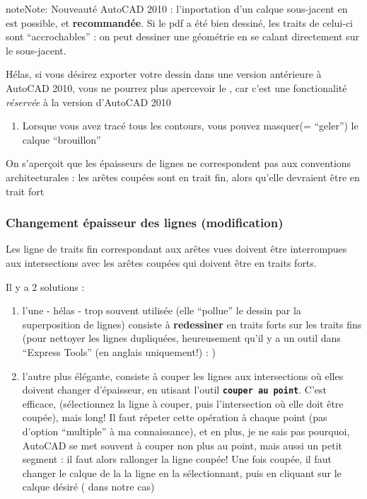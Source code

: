 \documentclass[a4paper,12pt,french]{sphinxmanual}
\begin{document}
\begin{notice}{note}{Note:}
Nouveauté AutoCAD 2010 : l'inportation d'un calque sous-jacent en  est possible, et \textbf{recommandée}. Si le pdf a été bien dessiné, les traits de celui-ci sont ``accrochables'' : on peut dessiner une géométrie en se calant directement sur le  sous-jacent.

Hélas, si vous désirez exporter votre dessin dans une version antérieure à AutoCAD 2010, vous ne pourrez plus apercevoir le , car c'est une fonctionalité \emph{réservée} à la version d'AutoCAD 2010
\end{notice}
\begin{enumerate}
\item {} 
Lorsque vous avez tracé tous les contours, vous pouvez masquer(= ``geler'') le calque ``brouillon''

\end{enumerate}

On s'aperçoit que les épaisseurs de lignes ne correspondent pas aux conventions architecturales : les arêtes coupées sont en trait fin, alors qu'elle devraient être en trait fort


\subsubsection{Changement épaisseur des lignes (modification)}
\label{init_su+acad/acad1:changement-epaisseur-des-lignes-modification}
Les ligne de traits fin correspondant aux arêtes vues doivent être interrompues aux intersections avec les arêtes coupées qui doivent être en traits forts.

Il y a 2 solutions :
\begin{enumerate}
\item {} 
l'une - hélas - trop souvent utilisée (elle ``pollue'' le dessin par la superposition de lignes) consiste à \textbf{redessiner} en traits forts sur les traits fins (pour nettoyer les lignes dupliquées, heureusement qu'il y a un outil dans ``Express Tools'' (en anglais uniquement!) : )

\item {} 
l'autre plus élégante, consiste à couper les lignes aux intersections où elles doivent changer d'épaisseur, en utisant l'outil \textbf{\texttt{couper au point}}. C'est efficace, (sélectionnez la ligne à couper, puis l'intersection où elle doit être coupée), mais long! Il faut répeter cette opération à chaque point (pas d'option ``multiple'' à ma connaissance), et en plus, je ne sais pas pourquoi, AutoCAD se met souvent à couper non plus au point, mais aussi un petit segment : il faut alors rallonger la ligne coupée! Une fois coupée, il faut changer le calque de la la ligne en la sélectionnant, puis en cliquant sur le calque désiré ( dans notre cas)

\end{enumerate}
\end{document}
